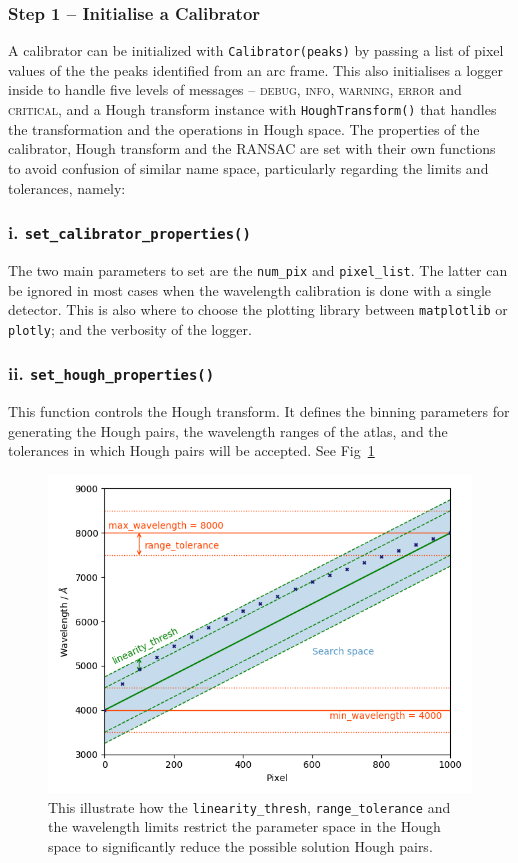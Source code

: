 \documentclass{aa}
\begin{document}
\subsubsection*{Step 1 -- Initialise a Calibrator}
A calibrator can be initialized with \texttt{Calibrator(peaks)} by passing a list
of pixel values of the the peaks identified from an arc frame. This also
initialises a logger inside to handle five levels of messages -- \textsc{debug},
\textsc{info}, \textsc{warning}, \textsc{error} and \textsc{critical}, and a
Hough transform instance with \texttt{HoughTransform()} that handles the
transformation and the operations in Hough space. The properties of the
calibrator, Hough transform and the RANSAC are set with their own functions to
avoid confusion of similar name space, particularly regarding the limits and
tolerances, namely:

\subsubsection*{i. \texttt{set\_calibrator\_properties()}}
The two main parameters to set are the \texttt{num\_pix} and \texttt{pixel\_list}.
The latter can be ignored in most cases when the wavelength calibration is done
with a single detector. This is also where to choose the plotting library between
\texttt{matplotlib} or \texttt{plotly}; and the verbosity of the logger.

\subsubsection*{ii. \texttt{set\_hough\_properties()}}
This function controls the Hough transform. It defines the binning parameters for
generating the Hough pairs, the wavelength ranges of the atlas, and the tolerances
in which Hough pairs will be accepted. See Fig~\ref{fig:threshold}

\begin{figure}
    \centering
    \includegraphics[width=\columnwidth]{threshold_plot.png}
    \caption{This illustrate how the \texttt{linearity\_thresh},
    \texttt{range\_tolerance} and the wavelength limits restrict the parameter
    space in the Hough space to significantly reduce the possible solution Hough
    pairs.}
    \label{fig:threshold}
\end{figure}
\end{document}

